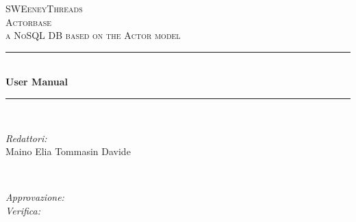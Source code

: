 \documentclass[a4paper]{article}
\begin{document}
	
	\begin{titlepage}
		\newcommand{\HRule}{\rule{\linewidth}{0.5mm}} 
		\center  
		
		\textsc{\LARGE SWEeneyThreads}\\[1.5cm] 
		\textsc{\Large Actorbase}\\[0.5cm] 
		\textsc{\large a NoSQL DB based on the Actor model}\\[0.5cm]
		
		
		\HRule \\[0.4cm]
		{ \huge \bfseries User Manual}\\[0.4cm] 
		\HRule \\[1.5cm]
		
		\begin{minipage}{0.4\textwidth}
			\begin{flushleft} \large
				\emph{Redattori:}\\
				Maino Elia \newline
				Tommasin Davide \\
			\end{flushleft}
		\end{minipage}
		~
		\begin{minipage}{0.4\textwidth}
			\begin{flushright} \large
				\emph{Approvazione:} \\
				\emph{Verifica:} 
			\end{flushright}
		\end{minipage}
		

\end{titlepage}
\end{document}
